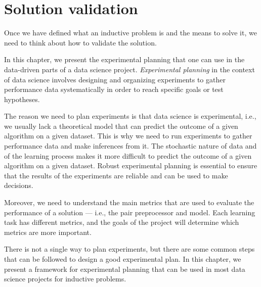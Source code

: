 \chapter{Solution validation}
\label{chap:planning}
\glsresetall


Once we have defined what an inductive problem is and the means to solve it, we need to
think about how to validate the solution.

In this chapter, we present the experimental planning that one can use in the data-driven
parts of a data science project.  \emph{Experimental planning}  in the context of data
science involves designing and organizing experiments to gather performance data
systematically in order to reach specific goals or test hypotheses.

The reason we need to plan experiments is that data science is experimental, i.e., we
usually lack a theoretical model that can predict the outcome of a given algorithm on a
given dataset.  This is why we need to run experiments to gather performance data and make
inferences from it.  The stochastic nature of data and of the learning process makes it
more difficult to predict the outcome of a given algorithm on a given dataset.  Robust
experimental planning is essential to ensure that the results of the experiments are
reliable and can be used to make decisions.

Moreover, we need to understand the main metrics that are used to evaluate the performance
of a solution --- i.e., the pair preprocessor and model.  Each learning task has different
metrics, and the goals of the project will determine which metrics are more important.

There is not a single way to plan experiments, but there are some common steps that can
be followed to design a good experimental plan.  In this chapter, we present a
framework for experimental planning that can be used in most data science projects
for inductive problems.

